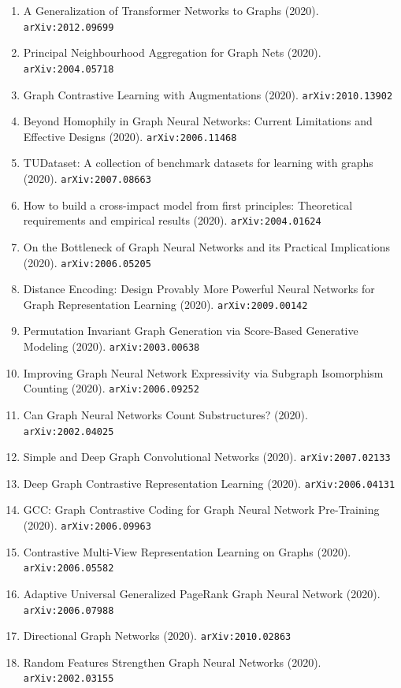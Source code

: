 \documentclass[11pt]{article}
\begin{document}
\begin{enumerate}
  \item A Generalization of Transformer Networks to Graphs (2020). \texttt{arXiv:2012.09699}
  \item Principal Neighbourhood Aggregation for Graph Nets (2020). \texttt{arXiv:2004.05718}
  \item Graph Contrastive Learning with Augmentations (2020). \texttt{arXiv:2010.13902}
  \item Beyond Homophily in Graph Neural Networks: Current Limitations and
  Effective Designs (2020). \texttt{arXiv:2006.11468}
  \item TUDataset: A collection of benchmark datasets for learning with graphs (2020). \texttt{arXiv:2007.08663}
  \item How to build a cross-impact model from first principles: Theoretical
  requirements and empirical results (2020). \texttt{arXiv:2004.01624}
  \item On the Bottleneck of Graph Neural Networks and its Practical
  Implications (2020). \texttt{arXiv:2006.05205}
  \item Distance Encoding: Design Provably More Powerful Neural Networks for
  Graph Representation Learning (2020). \texttt{arXiv:2009.00142}
  \item Permutation Invariant Graph Generation via Score-Based Generative
  Modeling (2020). \texttt{arXiv:2003.00638}
  \item Improving Graph Neural Network Expressivity via Subgraph Isomorphism
  Counting (2020). \texttt{arXiv:2006.09252}
  \item Can Graph Neural Networks Count Substructures? (2020). \texttt{arXiv:2002.04025}
  \item Simple and Deep Graph Convolutional Networks (2020). \texttt{arXiv:2007.02133}
  \item Deep Graph Contrastive Representation Learning (2020). \texttt{arXiv:2006.04131}
  \item GCC: Graph Contrastive Coding for Graph Neural Network Pre-Training (2020). \texttt{arXiv:2006.09963}
  \item Contrastive Multi-View Representation Learning on Graphs (2020). \texttt{arXiv:2006.05582}
  \item Adaptive Universal Generalized PageRank Graph Neural Network (2020). \texttt{arXiv:2006.07988}
  \item Directional Graph Networks (2020). \texttt{arXiv:2010.02863}
  \item Random Features Strengthen Graph Neural Networks (2020). \texttt{arXiv:2002.03155}

\end{enumerate}
\end{document}
